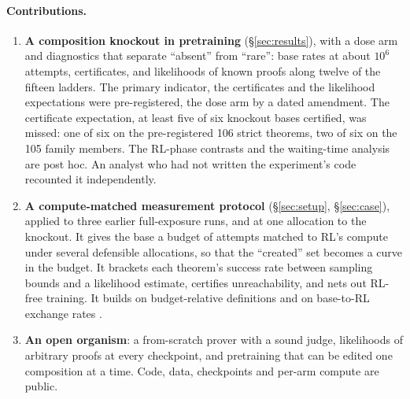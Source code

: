\paragraph{Contributions.}
\begin{enumerate}
\item \textbf{A composition knockout in pretraining} (\S\ref{sec:results}), with a dose arm and diagnostics that
separate ``absent'' from ``rare'': base rates at about $10^6$ attempts, certificates, and likelihoods of known proofs
along twelve of the fifteen ladders. The primary indicator, the certificates and the likelihood expectations were pre-registered, the
dose arm by a dated amendment. The certificate expectation, at least five of six knockout bases certified, was
missed: one of six on the pre-registered 106 strict theorems, two of six on the 105 family members. The RL-phase contrasts and the waiting-time analysis are post hoc. An analyst who had not
written the experiment's code recounted it independently.
\item \textbf{A compute-matched measurement protocol} (\S\ref{sec:setup}, \S\ref{sec:case}), applied to three earlier
full-exposure runs, and at one allocation to the knockout. It gives the base a budget of attempts matched to RL's
compute under several defensible allocations, so that the ``created'' set becomes a curve in the budget. It brackets
each theorem's success rate between sampling bounds and a likelihood estimate, certifies unreachability, and nets out
RL-free training. It builds on budget-relative definitions \citep{li2026elicitcreate,davidson2023retraining} and on
base-to-RL exchange rates \citep{sun2026budgeted}.
\item \textbf{An open organism}: a from-scratch prover with a sound judge, likelihoods of arbitrary proofs at every
checkpoint, and pretraining that can be edited one composition at a time. Code, data, checkpoints and per-arm compute
are public.
\end{enumerate}

